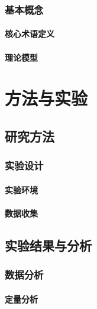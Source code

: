 \documentclass{USTBBook}
\begin{document}
\section{基本概念}
\zhlipsum[7]

\subsection{核心术语定义}
\zhlipsum[8]

\subsection{理论模型}
\zhlipsum[9]

\part{方法与实验}
\ToggleSectionStyle

\chapter{研究方法}
\zhlipsum[10]

\section{实验设计}
\zhlipsum[11]

\subsection{实验环境}
\zhlipsum[12]

\subsection{数据收集}
\zhlipsum[13]

\chapter{实验结果与分析}
\zhlipsum[14]

\section{数据分析}
\zhlipsum[15]

\subsection{定量分析}
\zhlipsum[16]
\end{document}
